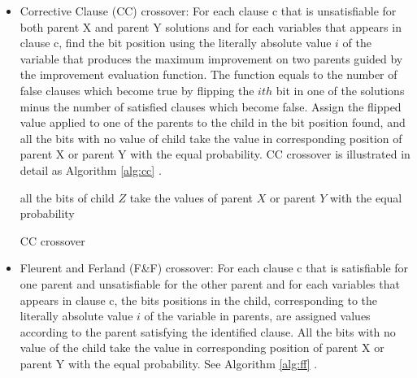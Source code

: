 \begin{itemize}
	\item
	      Corrective Clause (CC) crossover: For each clause c that is unsatisfiable for
	      both parent X and parent Y solutions and for each variables that appears in
	      clause c, find the bit position using the literally absolute value
	      $i$ of the variable that produces the maximum improvement
	      on two parents guided by the improvement evaluation function. The function
	      equals to the number of false clauses which become true by flipping the
	      $ith$ bit in one of the solutions minus the number of
	      satisfied clauses which become false. Assign the flipped value applied to one
	      of the parents to the child in the bit position found, and all the bits with
	      no value of child take the value in corresponding position of parent X or
	      parent Y with the equal probability. CC crossover is illustrated in detail as
	      Algorithm \ref{alg:cc} \parencite{lardeux2006gasat}.

	      \begin{algorithm}
		      \SetAlgoLined
		      \BlankLine
		      all the bits of child $Z$ take the values of parent
		      $X$ or parent $Y$ with the equal
		      probability\;  \caption{CC crossover}
		      \label{alg:cc}
	      \end{algorithm}

	\item
	      Fleurent and Ferland (F\&F) crossover: For each clause c that is satisfiable
	      for one parent and unsatisfiable for the other parent and for each variables
	      that appears in clause c, the bits positions in the child, corresponding to
	      the literally absolute value $i$ of the variable in
	      parents, are assigned values according to the parent satisfying the identified
	      clause. All the bits with no value of the child take the value in
	      corresponding position of parent X or parent Y with the equal probability. See
	      Algorithm \ref{alg:ff} \parencite{lardeux2006gasat}.


\end{itemize}
